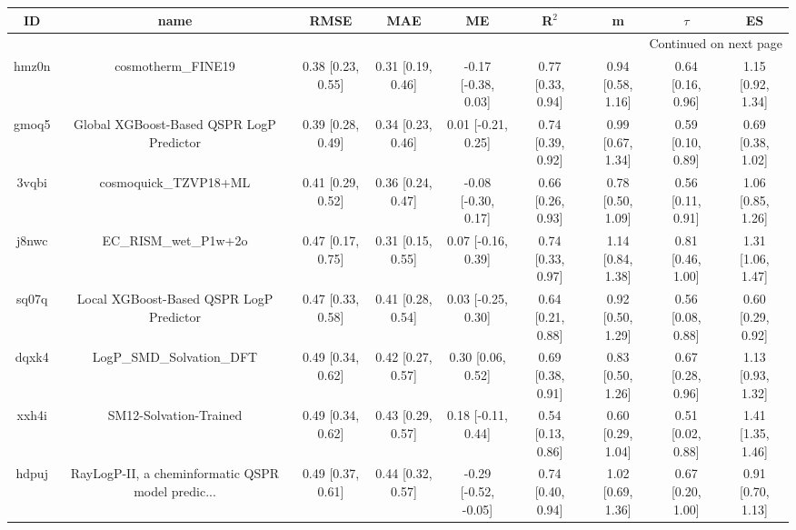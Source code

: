 \documentclass{article}
\begin{document}
\begin{center}
\scriptsize
\begin{longtable}{|ccccccccc|}
\toprule
    ID &                                               name &               RMSE &                MAE &                    ME &              R$^2$ &                    m &               $\tau$ &                    ES \\
\midrule
\endhead
\midrule
\multicolumn{9}{r}{{Continued on next page}} \\
\midrule
\endfoot

\bottomrule
\endlastfoot
 hmz0n &                                 cosmotherm\_FINE19 &  0.38 [0.23, 0.55] &  0.31 [0.19, 0.46] &   -0.17 [-0.38, 0.03] &  0.77 [0.33, 0.94] &    0.94 [0.58, 1.16] &    0.64 [0.16, 0.96] &     1.15 [0.92, 1.34] \\
 gmoq5 &           Global XGBoost-Based QSPR LogP Predictor &  0.39 [0.28, 0.49] &  0.34 [0.23, 0.46] &    0.01 [-0.21, 0.25] &  0.74 [0.39, 0.92] &    0.99 [0.67, 1.34] &    0.59 [0.10, 0.89] &     0.69 [0.38, 1.02] \\
 3vqbi &                              cosmoquick\_TZVP18+ML &  0.41 [0.29, 0.52] &  0.36 [0.24, 0.47] &   -0.08 [-0.30, 0.17] &  0.66 [0.26, 0.93] &    0.78 [0.50, 1.09] &    0.56 [0.11, 0.91] &     1.06 [0.85, 1.26] \\
 j8nwc &                              EC\_RISM\_wet\_P1w+2o &  0.47 [0.17, 0.75] &  0.31 [0.15, 0.55] &    0.07 [-0.16, 0.39] &  0.74 [0.33, 0.97] &    1.14 [0.84, 1.38] &    0.81 [0.46, 1.00] &     1.31 [1.06, 1.47] \\
 sq07q &            Local XGBoost-Based QSPR LogP Predictor &  0.47 [0.33, 0.58] &  0.41 [0.28, 0.54] &    0.03 [-0.25, 0.30] &  0.64 [0.21, 0.88] &    0.92 [0.50, 1.29] &    0.56 [0.08, 0.88] &     0.60 [0.29, 0.92] \\
 dqxk4 &                          LogP\_SMD\_Solvation\_DFT &  0.49 [0.34, 0.62] &  0.42 [0.27, 0.57] &     0.30 [0.06, 0.52] &  0.69 [0.38, 0.91] &    0.83 [0.50, 1.26] &    0.67 [0.28, 0.96] &     1.13 [0.93, 1.32] \\
 xxh4i &                             SM12-Solvation-Trained &  0.49 [0.34, 0.62] &  0.43 [0.29, 0.57] &    0.18 [-0.11, 0.44] &  0.54 [0.13, 0.86] &    0.60 [0.29, 1.04] &    0.51 [0.02, 0.88] &     1.41 [1.35, 1.46] \\
 hdpuj &  RayLogP-II, a cheminformatic QSPR model predic... &  0.49 [0.37, 0.61] &  0.44 [0.32, 0.57] &  -0.29 [-0.52, -0.05] &  0.74 [0.40, 0.94] &    1.02 [0.69, 1.36] &    0.67 [0.20, 1.00] &     0.91 [0.70, 1.13] \\

\end{longtable}
\end{center}
\end{document}
